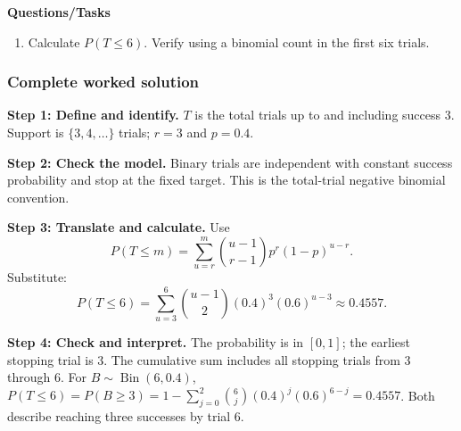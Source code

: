 \textbf{Questions/Tasks}
\begin{enumerate}
\item Calculate $P(T\leq6)$. Verify using a binomial count in the first six trials.
\end{enumerate}
\subsubsection*{Complete worked solution}
\par\noindent\begin{minipage}{\linewidth}
\textbf{Step 1: Define and identify.} $T$ is the total trials up to and including success 3. Support is $\{3,4,\ldots\}$ trials; $r=3$ and $p=0.4$.
\end{minipage}\par\medskip
\par\noindent\begin{minipage}{\linewidth}
\textbf{Step 2: Check the model.} Binary trials are independent with constant success probability and stop at the fixed target. This is the total-trial negative binomial convention.
\end{minipage}\par\medskip
\par\noindent\begin{minipage}{\linewidth}
\textbf{Step 3: Translate and calculate.} Use
\[P(T\leq m)=\sum_{u=r}^{m}\binom{u-1}{r-1}p^r(1-p)^{u-r}.\]
Substitute:
\[P(T\leq6)=\sum_{u=3}^{6}\binom{u-1}{2}(0.4)^3(0.6)^{u-3}\approx 0.4557.\]
\end{minipage}\par\medskip
\par\noindent\begin{minipage}{\linewidth}
\textbf{Step 4: Check and interpret.} The probability is in $[0,1]$; the earliest stopping trial is 3. The cumulative sum includes all stopping trials from 3 through 6. For $B\sim\operatorname{Bin}(6,0.4)$, $P(T\leq6)=P(B\geq3)=1-\sum_{j=0}^{2}\binom6j(0.4)^j(0.6)^{6-j}=0.4557$. Both describe reaching three successes by trial 6.
\end{minipage}\par\medskip
